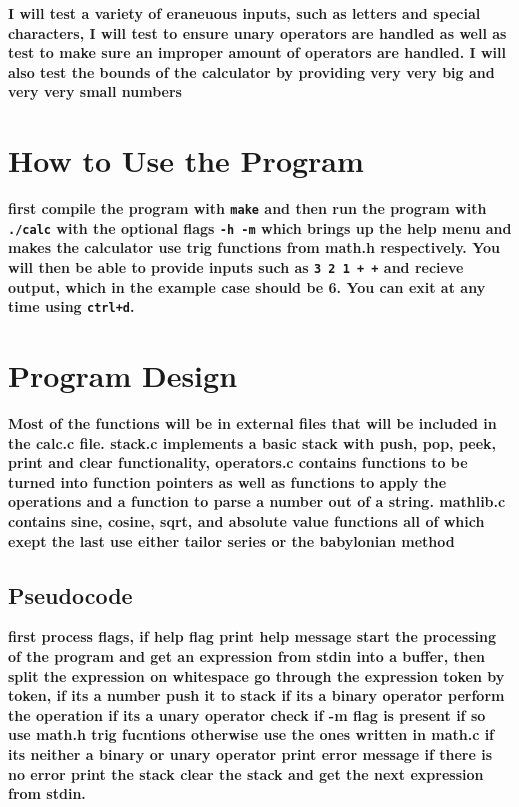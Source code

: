 \documentclass{article}
\begin{document}
\textbf{I will test a variety of eraneuous inputs, such as letters and special characters, I will test to ensure unary operators are handled as well as test to make sure an improper amount of operators are handled. I will also test the bounds of the calculator by providing very very big and very very small numbers}

\section*{How to Use the Program}

\textbf{first compile the program with \lstinline{make} and then run the program with \lstinline{./calc} with the optional flags \lstinline{-h -m} which brings up the help menu and makes the calculator use trig functions from math.h respectively. You will then be able to provide inputs such as \lstinline{3 2 1 + +} and recieve output, which in the example case should be 6. You can exit at any time using \lstinline{ctrl+d}.}

\section*{Program Design}

\textbf{Most of the functions will be in external files that will be included in the calc.c file. stack.c implements a basic stack with push, pop, peek, print and clear functionality, operators.c contains functions to be turned into function pointers as well as functions to apply the operations and a function to parse a number out of a string. mathlib.c contains sine, cosine, sqrt, and absolute value functions all of which exept the last use either tailor series or the babylonian method}

\subsection*{Pseudocode}

\textbf{first process flags, if help flag print help message
start the processing of the program and get an expression from stdin into a buffer, then split the expression on whitespace
go through the expression token by token, if its a number push it to stack
if its a binary operator perform the operation
if its a unary operator check if -m flag is present if so use math.h trig fucntions otherwise use the ones written in math.c
if its neither a binary or unary operator print error message
if there is no error print the stack
clear the stack and get the next expression from stdin.}
\end{document}
